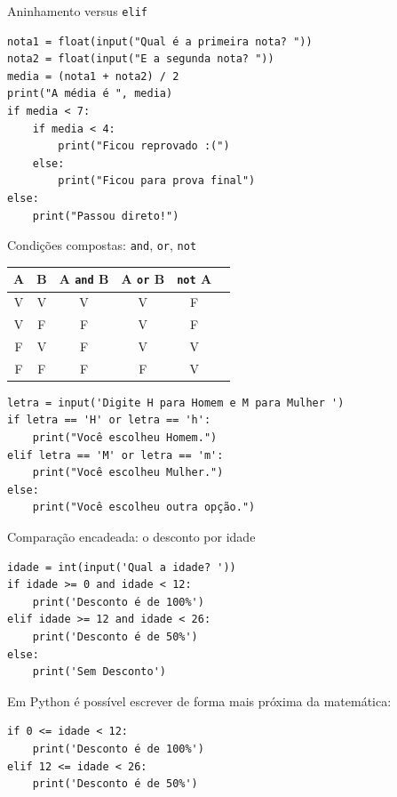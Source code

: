 \documentclass[aspectratio=169,10pt,t]{beamer}
\begin{document}
\begin{frame}[fragile]{Aninhamento versus \texttt{elif}}
\begin{lstlisting}
nota1 = float(input("Qual é a primeira nota? "))
nota2 = float(input("E a segunda nota? "))
media = (nota1 + nota2) / 2
print("A média é ", media)
if media < 7:
    if media < 4:
        print("Ficou reprovado :(")
    else:
        print("Ficou para prova final")
else:
    print("Passou direto!")
\end{lstlisting}
\end{frame}

\begin{frame}[fragile]{Condições compostas: \texttt{and}, \texttt{or}, \texttt{not}}
  \centering\small
  \begin{tabular}{ccc|ccc}
    \toprule
    A & B & A \texttt{and} B & A \texttt{or} B & \texttt{not} A\\
    \midrule
    V & V & V & V & F\\
    V & F & F & V & F\\
    F & V & F & V & V\\
    F & F & F & F & V\\
    \bottomrule
  \end{tabular}
  \vspace{1ex}
\begin{lstlisting}
letra = input('Digite H para Homem e M para Mulher ')
if letra == 'H' or letra == 'h':
    print("Você escolheu Homem.")
elif letra == 'M' or letra == 'm':
    print("Você escolheu Mulher.")
else:
    print("Você escolheu outra opção.")
\end{lstlisting}
\end{frame}

\begin{frame}[fragile]{Comparação encadeada: o desconto por idade}
\begin{lstlisting}
idade = int(input('Qual a idade? '))
if idade >= 0 and idade < 12:
    print('Desconto é de 100%')
elif idade >= 12 and idade < 26:
    print('Desconto é de 50%')
else:
    print('Sem Desconto')
\end{lstlisting}
  Em Python é possível escrever de forma mais próxima da matemática:
\begin{lstlisting}
if 0 <= idade < 12:
    print('Desconto é de 100%')
elif 12 <= idade < 26:
    print('Desconto é de 50%')
\end{lstlisting}
\end{frame}
\end{document}
